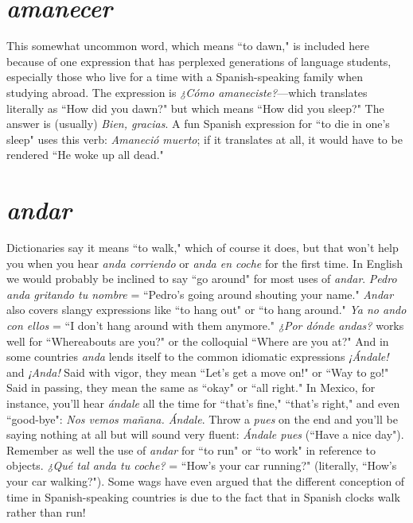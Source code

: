 \section{\emph{amanecer}}

This somewhat uncommon word, which means ``to dawn," is
included here because of one expression that has perplexed generations
of language students, especially those who live for a time with a
Spanish-speaking family when studying abroad. The expression is
\emph{¿Cómo amaneciste?}---which translates literally as ``How did you
dawn?" but which means ``How did you sleep?" The answer is (usually) \emph{Bien, gracias}. A fun Spanish expression for ``to die in one's sleep"
uses this verb: \emph{Amaneció muerto}; if it translates at all, it would have
to be rendered ``He woke up all dead."

\section{\emph{andar}}

Dictionaries say it means ``to walk," which of course it does,
but that won't help you when you hear \emph{anda corriendo} or \emph{anda en
coche} for the first time. In English we would probably be inclined
to say ``go around" for most uses of \emph{andar}. \emph{Pedro anda gritando tu
nombre} = ``Pedro's going around shouting your name." \emph{Andar} also
covers slangy expressions like ``to hang out" or ``to hang around." \emph{Ya
no ando con ellos} = ``I don't hang around with them anymore." \emph{¿Por
dónde andas?} works well for ``Whereabouts are you?" or the colloquial
``Where are you at?" And in some countries \emph{anda} lends itself to the
common idiomatic expressions \emph{¡Ándale!} and \emph{¡Anda!} Said with vigor,
they mean ``Let's get a move on!" or ``Way to go!" Said in passing, they
mean the same as ``okay" or ``all right." In Mexico, for instance, you'll
hear \emph{ándale} all the time for ``that's fine," ``that's right," and even
``good-bye": \emph{Nos vemos mañana. Ándale}. Throw a \emph{pues} on the end
and you'll be saying nothing at all but will sound very fluent: \emph{Ándale
pues} (``Have a nice day"). Remember as well the use of \emph{andar} for ``to
run" or ``to work" in reference to objects. \emph{¿Qué tal anda tu coche?} =
``How's your car running?" (literally, ``How's your car walking?").
Some wags have even argued that the different conception of time in
Spanish-speaking countries is due to the fact that in Spanish clocks
walk rather than run!

